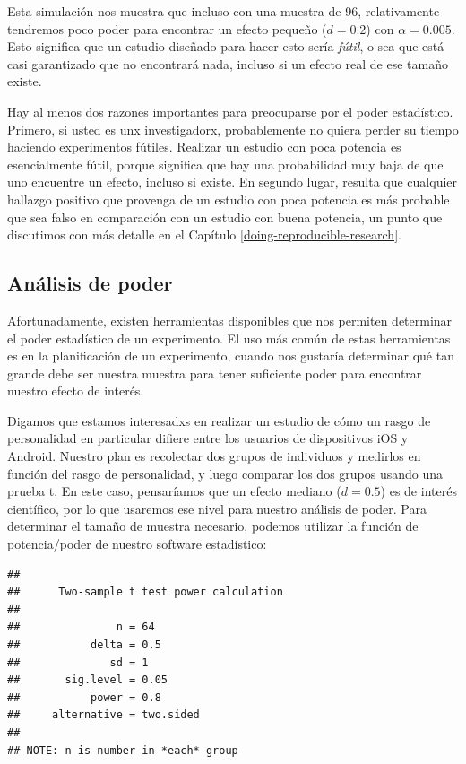 \documentclass[
  12pt,
]{book}
\begin{document}
Esta simulación nos muestra que incluso con una muestra de 96, relativamente tendremos poco poder para encontrar un efecto pequeño (\(d = 0.2\)) con \(\alpha = 0.005\). Esto significa que un estudio diseñado para hacer esto sería \emph{fútil}, o sea que está casi garantizado que no encontrará nada, incluso si un efecto real de ese tamaño existe.

Hay al menos dos razones importantes para preocuparse por el poder estadístico. Primero, si usted es unx investigadorx, probablemente no quiera perder su tiempo haciendo experimentos fútiles. Realizar un estudio con poca potencia es esencialmente fútil, porque significa que hay una probabilidad muy baja de que uno encuentre un efecto, incluso si existe. En segundo lugar, resulta que cualquier hallazgo positivo que provenga de un estudio con poca potencia es más probable que sea falso en comparación con un estudio con buena potencia, un punto que discutimos con más detalle en el Capítulo \ref{doing-reproducible-research}.

\hypertarget{anuxe1lisis-de-poder}{%
\subsection{Análisis de poder}\label{anuxe1lisis-de-poder}}

Afortunadamente, existen herramientas disponibles que nos permiten determinar el poder estadístico de un experimento. El uso más común de estas herramientas es en la planificación de un experimento, cuando nos gustaría determinar qué tan grande debe ser nuestra muestra para tener suficiente poder para encontrar nuestro efecto de interés.

Digamos que estamos interesadxs en realizar un estudio de cómo un rasgo de personalidad en particular difiere entre los usuarios de dispositivos iOS y Android. Nuestro plan es recolectar dos grupos de individuos y medirlos en función del rasgo de personalidad, y luego comparar los dos grupos usando una prueba t. En este caso, pensaríamos que un efecto mediano (\(d = 0.5\)) es de interés científico, por lo que usaremos ese nivel para nuestro análisis de poder. Para determinar el tamaño de muestra necesario, podemos utilizar la función de potencia/poder de nuestro software estadístico:

\begin{verbatim}
## 
##      Two-sample t test power calculation 
## 
##               n = 64
##           delta = 0.5
##              sd = 1
##       sig.level = 0.05
##           power = 0.8
##     alternative = two.sided
## 
## NOTE: n is number in *each* group
\end{verbatim}
\end{document}
